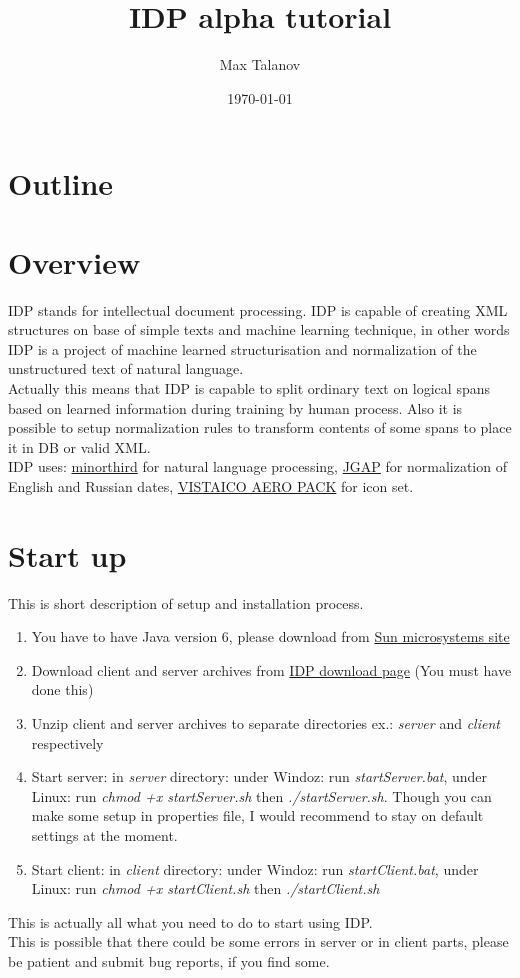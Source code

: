 \documentclass[12pt]{article}
\title{IDP alpha tutorial}
\author{Max Talanov}
\date{\today}
\begin{document}
\maketitle

\section{Outline}
\tableofcontents

\section{Overview}
IDP stands for intellectual document processing. IDP is capable of creating XML structures on base of simple texts and machine learning technique, in other words IDP is a project of machine learned structurisation and normalization of the unstructured text of natural language.\\
Actually this means that IDP is capable to split ordinary text on logical spans based on learned information during training by human process. Also it is possible to setup normalization rules to transform contents of some spans to place it in DB or valid XML.\\ 
IDP uses: \href{http://minorthird.sourceforge.net/}{minorthird} for natural language processing, \href{jgap.sourceforge.net}{JGAP} for normalization of English and Russian dates, \href{http://www.vistaicons.com/}{VISTAICO AERO PACK} for icon set.

\section{Start up}
This is short description of setup and installation process.
\begin{enumerate}
  \item You have to have Java version 6, please download from \href{http://java.sun.com/javase/downloads/index.jsp}{Sun microsystems site}
  \item Download client and server archives from \href{http://code.google.com/p/idp/downloads/list}{IDP download page} (You must have done this)
  \item Unzip client and server archives to separate directories ex.: \emph{server} and \emph{client} respectively
  \item Start server: in \emph{server} directory: under Windoz: run \emph{startServer.bat}, under Linux: run \emph{chmod +x startServer.sh} then \emph{./startServer.sh}. Though you can make some setup in properties file, I would recommend to stay on default settings at the moment.
  \item Start client: in \emph{client} directory: under Windoz: run \emph{startClient.bat}, under Linux: run \emph{chmod +x startClient.sh} then \emph{./startClient.sh}
\end{enumerate}
This is actually all what you need to do to start using IDP.\\
This is possible that there could be some errors in server or in client parts, please be patient and submit bug reports, if you find some.
\end{document}
